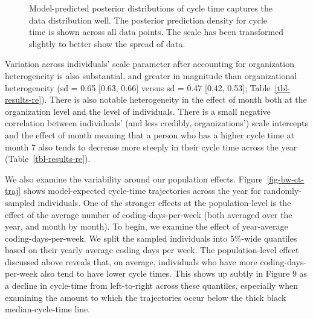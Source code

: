 \documentclass[manuscript,screen,review]{acmart}
\begin{document}
\begin{figure}


\caption[Model-predicted posterior distributions of cycle time captures
the data distribution well]{\label{fig-pp-check-sum}Model-predicted
posterior distributions of cycle time captures the data distribution
well. The posterior prediction density for cycle time is shown across
all data points. The scale has been transformed slightly to better show
the spread of data.}

\end{figure}%

Variation across individuals' scale parameter after accounting for
organization heterogeneity is also substantial, and greater in magnitude
than organizational heterogeneity (sd = 0.65 {[}0.63, 0.66{]} versus sd
= 0.47 {[}0.42, 0.53{]}; Table~\ref{tbl-results-re}). There is also
notable heterogeneity in the effect of month both at the organization
level and the level of individuals. There is a small negative
correlation between individuals' (and less credibly, organizations')
scale intercepts and the effect of month meaning that a person who has a
higher cycle time at month 7 also tends to decrease more steeply in
their cycle time across the year (Table~\ref{tbl-results-re}).

We also examine the variability around our population effects.
Figure~\ref{fig-bw-ct-traj} shows model-expected cycle-time trajectories
across the year for randomly-sampled individuals. One of the stronger
effects at the population-level is the effect of the average number of
coding-days-per-week (both averaged over the year, and month by month).
To begin, we examine the effect of year-average coding-days-per-week. We
split the sampled individuals into 5\%-wide quantiles based on their
yearly average coding days per week. The population-level effect
discussed above reveals that, on average, individuals who have more
coding-days-per-week also tend to have lower cycle times. This shows up
subtly in Figure 9 as a decline in cycle-time from left-to-right across
these quantiles, especially when examining the amount to which the
trajectories occur below the thick black median-cycle-time line.
\end{document}
